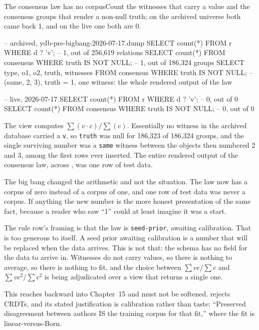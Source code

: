 \begin{Correspondence}{The consensus law has no corpus}{Count the witnesses that carry a value and the consensus groups that render a non-null truth; on the archived universe both came back 1, and on the live one both are 0.}
\begin{Check}
-- archived, ydb-pre-bigbang-2026-07-17.dump
SELECT count(*) FROM r WHERE d ? 'v';                    -- 1, out of 256,619 relations
SELECT count(*) FROM consensus WHERE truth IS NOT NULL;  -- 1, out of 186,324 groups
SELECT type, o1, o2, truth, witnesses FROM consensus WHERE truth IS NOT NULL;
    -- (same, 2, 3), truth = 1, one witness: the whole rendered output of the law

-- live, 2026-07-17
SELECT count(*) FROM r WHERE d ? 'v';                    -- 0, out of 0
SELECT count(*) FROM consensus WHERE truth IS NOT NULL;  -- 0, out of 0
\end{Check}
The view computes $\sum(v \cdot c) / \sum(c)$. Essentially no witness in the archived database carried a \texttt{v}, so \texttt{truth} was null for 186,323 of 186,324 groups, and the single surviving number was a \texttt{same} witness between the objects then numbered 2 and 3, among the first rows ever inserted. The entire rendered output of the consensus law, across \labCorpus{}, was one row of test data.

The big bang changed the arithmetic and not the situation. The law now has a corpus of zero instead of a corpus of one, and one row of test data was never a corpus. If anything the new number is the more honest presentation of the same fact, because a reader who saw ``1'' could at least imagine it was a start.

The rule row's framing is that the law is \texttt{seed-prior}, awaiting calibration. That is too generous to itself. A seed prior awaiting calibration is a number that will be replaced when the data arrives. This is not that: the schema has no field for the data to arrive in. Witnesses do not carry values, so there is nothing to average, so there is nothing to fit, and the choice between $\sum vc/\sum c$ and $\sum vc^2/\sum c^2$ is being adjudicated over a view that returns a single one.
\end{Correspondence}

This reaches backward into Chapter~15 and must not be softened.  rejects CRDTs, and its stated justification is calibration rather than taste: ``Preserved disagreement between authors IS the training corpus for that fit,'' where the fit is linear-versus-Born.

